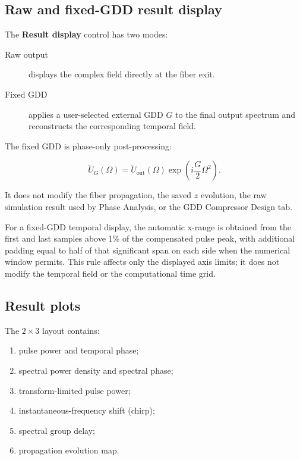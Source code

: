 \documentclass[11pt,a4paper]{article}
\begin{document}
\subsection{Raw and fixed-GDD result display}

The \textbf{Result display} control has two modes:

\begin{description}
    \item[Raw output] displays the complex field directly at the fiber exit.
    \item[Fixed GDD] applies a user-selected external GDD $G$ to the final
    output spectrum and reconstructs the corresponding temporal field.
\end{description}

The fixed GDD is phase-only post-processing:

\begin{equation}
\widetilde U_G(\Omega)
=
\widetilde U_{\mathrm{out}}(\Omega)
\exp\left(i\frac{G}{2}\Omega^2\right).
\end{equation}

It does not modify the fiber propagation, the saved $z$ evolution, the raw
simulation result used by Phase Analysis, or the GDD Compressor Design tab.

For a fixed-GDD temporal display, the automatic x-range is obtained from the
first and last samples above 1\% of the compensated pulse peak, with additional
padding equal to half of that significant span on each side when the numerical
window permits. This rule affects only the displayed axis limits; it does not
modify the temporal field or the computational time grid.

\subsection{Result plots}

The $2\times3$ layout contains:

\begin{enumerate}
    \item pulse power and temporal phase;
    \item spectral power density and spectral phase;
    \item transform-limited pulse power;
    \item instantaneous-frequency shift (chirp);
    \item spectral group delay;
    \item propagation evolution map.
\end{enumerate}
\end{document}
